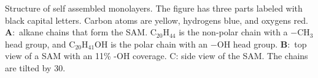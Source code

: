 \label{fig:SAMstructure}Structure of self assembled monolayers.
The figure has three parts labeled with black capital letters. Carbon
atoms are yellow, hydrogens blue, and oxygens red. \textbf{A}:~alkane
chains that form the SAM. $\mathrm{C_{20}H_{44}}$ is the non-polar
chain with a $\mathrm{-CH_{3}}$ head group, and $\mathrm{C_{20}H_{41}OH}$
is the polar chain with an $\mathrm{-OH}$ head group. \textbf{B}:~top
view of a SAM with an 11\% -OH coverage. C: side view of the SAM.
The chains are tilted by 30\textdegree . \cite{humphrey:1996}